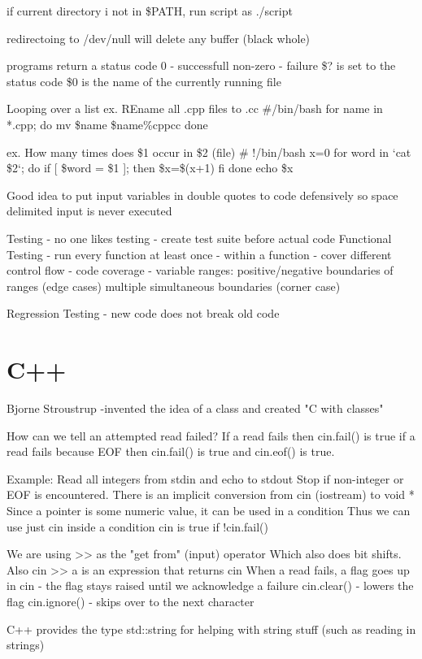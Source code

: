 \documentclass[12pt,oneside,fleqn]{book}
\begin{document}
if current directory i not in \$PATH, run script as ./script

redirectoing to /dev/null will delete any buffer (black whole)

programs return a status code
0 - successfull
non-zero - failure
\$? is set to the status code
\$0 is the name of the currently running file

Looping over a list
ex.
REname all .cpp files to .cc
\#\!/bin/bash
for name in *.cpp; do
	mv \${name} \${name\%cpp}cc
done

ex.
How many times does \$1 occur in \$2 (file)
\# !/bin/bash
x=0
for word in `cat \$2`; do
	if [ \$word = \$1 ]; then
		\$x=\$(x+1)
	fi
done
echo \$x

Good idea to put input variables in double quotes to code defensively so space delimited input is never executed

Testing
- no one likes testing
- create test suite before actual code
Functional Testing
- run every function at least once
- within a function
	- cover different control flow
	- code coverage
	- variable ranges: 	positive/negative
						boundaries of ranges (edge cases)
						multiple simultaneous boundaries (corner case)

Regression Testing
- new code does not break old code


\section{C++}
Bjorne Stroustrup
-invented the idea of a class and created "C with classes"

How can we tell an attempted read failed?
If a read fails then cin.fail() is true
if a read fails because EOF then cin.fail() is true and cin.eof() is true.

Example:
Read all integers from stdin and echo to stdout
Stop if non-integer or EOF is encountered.
There is an implicit conversion from cin (iostream) to void *
Since a pointer is some numeric value, it can be used in a condition
Thus we can use just cin inside a condition
cin is true if !cin.fail()

We are using >> as the "get from" (input) operator 
Which also does bit shifts.
Also cin >> a is an expression that returns cin
When a read fails, a flag goes up in cin
- the flag stays raised until we acknowledge a failure
cin.clear() - lowers the flag
cin.ignore() - skips over to the next character

C++ provides the type std::string for helping with string stuff (such as reading in strings)
\end{document}
